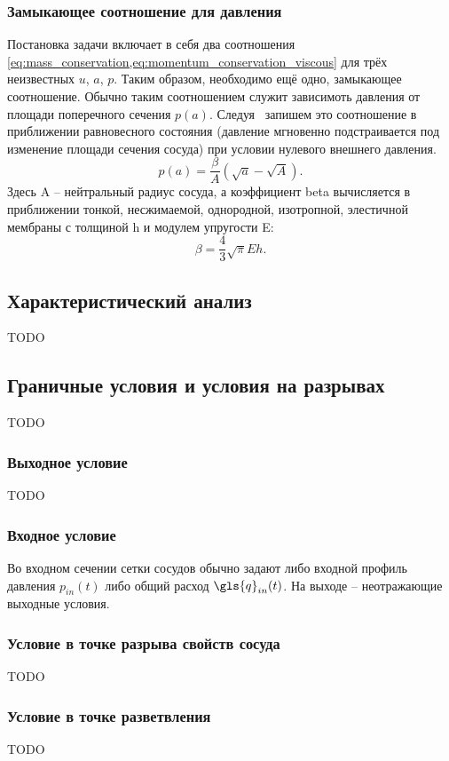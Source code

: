\subsubsection{Замыкающее соотношение для давления}
Постановка задачи включает в себя два соотношения \cref{eq:mass_conservation,eq:momentum_conservation_viscous}
для трёх неизвестных $u$, $a$, $p$. Таким образом, необходимо ещё одно,
замыкающее соотношение.
Обычно таким соотношением служит зависимоть давления от площади поперечного сечения $p(a)$.
Следуя~\cite{Formaggia2003} запишем это соотношение в приближении равновесного состояния (давление мгновенно подстраивается под изменение площади сечения сосуда)
при условии нулевого внешнего давления.
\begin{equation}
\nonumber
p(a) = \frac{\beta}{A} \left(\sqrt{a} - \sqrt A\right).
\end{equation}
Здесь \gls{A} -- нейтральный радиус сосуда,
а коэффициент \gls{beta} вычисляется в приближении тонкой, несжимаемой, однородной, изотропной, элестичной мембраны с толщиной \gls{h} и 
модулем упругости \gls{E}:
\begin{equation}
\nonumber
\beta = \frac{4}{3}\sqrt{\pi}E h.
\end{equation}

\subsection{Характеристический анализ}
TODO

\subsection{Граничные условия и условия на разрывах}
TODO

\subsubsection{Выходное условие}
TODO

\subsubsection{Входное условие}
Во входном сечении сетки сосудов обычно задают либо входной профиль давления $p_{in}(t)$
либо общий расход $\gls{q}_{in}(t)$. На выходе -- неотражающие выходные условия.

\subsubsection{Условие в точке разрыва свойств сосуда}
TODO

\subsubsection{Условие в точке разветвления}
TODO
